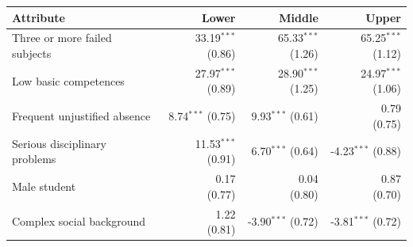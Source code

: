 \begin{tabular}{lrrr}
\toprule
Attribute & Lower & Middle & Upper \\
\midrule
Three or more failed subjects & \shortstack{33.19$^{***}$\\{\scriptsize (0.86)}} & \shortstack{65.33$^{***}$\\{\scriptsize (1.26)}} & \shortstack{65.25$^{***}$\\{\scriptsize (1.12)}} \\
Low basic competences & \shortstack{27.97$^{***}$\\{\scriptsize (0.89)}} & \shortstack{28.90$^{***}$\\{\scriptsize (1.25)}} & \shortstack{24.97$^{***}$\\{\scriptsize (1.06)}} \\
Frequent unjustified absence & \shortstack{8.74$^{***}$\\{\scriptsize (0.75)}} & \shortstack{9.93$^{***}$\\{\scriptsize (0.61)}} & \shortstack{0.79\\{\scriptsize (0.75)}} \\
Serious disciplinary problems & \shortstack{11.53$^{***}$\\{\scriptsize (0.91)}} & \shortstack{6.70$^{***}$\\{\scriptsize (0.64)}} & \shortstack{-4.23$^{***}$\\{\scriptsize (0.88)}} \\
Male student & \shortstack{0.17\\{\scriptsize (0.77)}} & \shortstack{0.04\\{\scriptsize (0.80)}} & \shortstack{0.87\\{\scriptsize (0.70)}} \\
Complex social background & \shortstack{1.22\\{\scriptsize (0.81)}} & \shortstack{-3.90$^{***}$\\{\scriptsize (0.72)}} & \shortstack{-3.81$^{***}$\\{\scriptsize (0.72)}} \\
\bottomrule
\end{tabular}
